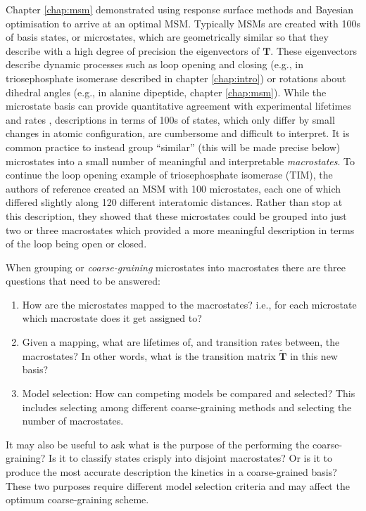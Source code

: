 Chapter \ref{chap:msm} demonstrated using response surface methods and Bayesian optimisation to arrive at an optimal MSM. Typically MSMs are created with \num{100}s of basis states, or microstates, which are geometrically similar so that they describe with a high degree of precision the eigenvectors of $\mathbf{T}$. These eigenvectors describe dynamic processes such as loop opening and closing (e.g., in triosephosphate isomerase \cite{LoopMotionTriosephosphate} described in chapter \ref{chap:intro}) or rotations about dihedral angles  (e.g., in alanine dipeptide, chapter \ref{chap:msm}). While the microstate basis can provide quantitative agreement with experimental lifetimes and rates \cite{bowmanNetworkModelsMolecular2010},  descriptions in terms of \num{100}s of states, which only differ by small changes in atomic configuration, are cumbersome and difficult to interpret.  It is common practice to instead group ``similar'' (this will be made precise below) microstates into a small number of meaningful and interpretable \emph{macrostates}.  To continue the loop opening example of triosephosphate isomerase (TIM), the authors of reference \cite{LoopMotionTriosephosphate} created an MSM with 100 microstates, each one of which differed slightly along 120 different interatomic distances.  Rather than stop at this description, they showed that these microstates could be grouped into just two or three macrostates which provided a more meaningful description in terms of the loop being open or closed. 

When grouping or \emph{coarse-graining} microstates into macrostates there are three questions that need to be answered: 

\begin{enumerate}
    \item How are the microstates mapped to the macrostates?  i.e., for each microstate which macrostate does it get assigned to?  
    \item Given a mapping, what are lifetimes of, and transition rates between, the macrostates? In other words, what is the transition matrix $\widetilde{\mathbf{T}}$ in this new basis?
    \item Model selection: How can competing models be compared and selected? This includes selecting among different coarse-graining methods and selecting the number of macrostates. 

\end{enumerate}
It may also be useful to ask what is the purpose of the performing the coarse-graining?  Is it to classify states crisply into disjoint macrostates? Or is it to produce the most accurate description the kinetics in a coarse-grained basis?  These two purposes require different model selection criteria and may affect the optimum coarse-graining scheme.

